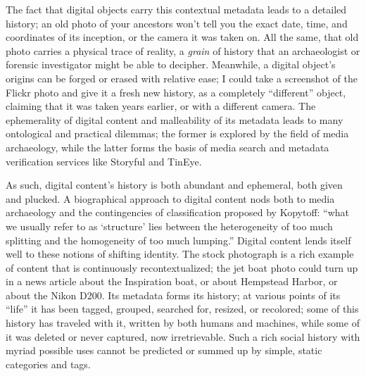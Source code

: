 The fact that digital objects carry this contextual metadata leads to a detailed history; an old photo of your ancestors won't tell you the exact date, time, and coordinates of its inception, or the camera it was taken on. All the same, that old photo carries a physical trace of reality, a \emph{grain} of history that an archaeologist or forensic investigator might be able to decipher. Meanwhile, a digital object's origins can be forged or erased with relative ease; I could take a screenshot of the Flickr photo and give it a fresh new history, as a completely ``different'' object, claiming that it was taken years earlier, or with a different camera. The ephemerality of digital content and malleability of its metadata leads to many ontological and practical dilemmas; the former is explored by the field of media archaeology, while the latter forms the basis of media search and metadata verification services like Storyful and TinEye.

As such, digital content's history is both abundant and ephemeral, both given and plucked. A biographical approach to digital content nods both to media archaeology and the contingencies of classification proposed by Kopytoff: ``what we usually refer to as `structure' lies between the heterogeneity of too much splitting and the homogeneity of too much lumping.''\autocite[70]{appadurai_cultural_1986} Digital content lends itself well to these notions of shifting identity. The stock photograph is a rich example of content that is continuously recontextualized; the jet boat photo could turn up in a news article about the Inspiration boat, or about Hempstead Harbor, or about the Nikon D200. Its metadata forms its history; at various points of its ``life'' it has been tagged, grouped, searched for, resized, or recolored; some of this history has traveled with it, written by both humans and machines, while some of it was deleted or never captured, now irretrievable. Such a rich social history with myriad possible uses cannot be predicted or summed up by simple, static categories and tags.

